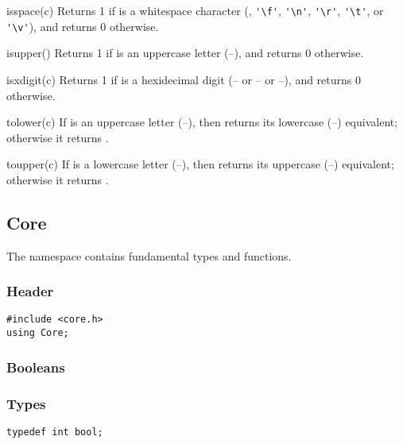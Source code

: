 \begin{defun}{isspace}{(c)}
Returns 1 if  is a whitespace character (,
\verb|'\f'|, \verb|'\n'|, \verb|'\r'|, \verb|'\t'|, or \verb|'\v'|),
and returns 0 otherwise.
\end{defun}

\begin{defun}{isupper}{()}
Returns 1 if  is an uppercase letter
(--), and returns 0 otherwise.
\end{defun}

\begin{defun}{isxdigit}{(c)}
Returns 1 if  is a hexidecimal digit (-- or
-- or --), and returns 0
otherwise.
\end{defun}

\begin{defun}{tolower}{(c)}
If  is an uppercase letter (--), then
 returns its lowercase (--)
equivalent; otherwise it returns .
\end{defun}

\begin{defun}{toupper}{(c)}
If  is a lowercase letter (--), then
 returns its uppercase
(--) equivalent; otherwise it returns .
\end{defun}

\subsection{Core}

The  namespace contains fundamental types and functions.

\subsubsection*{Header}
\begin{verbatim}
#include <core.h>
using Core;
\end{verbatim}

\subsubsection*{Booleans}
\subsubsection*{Types}
\begin{verbatim}
typedef int bool;
\end{verbatim}

